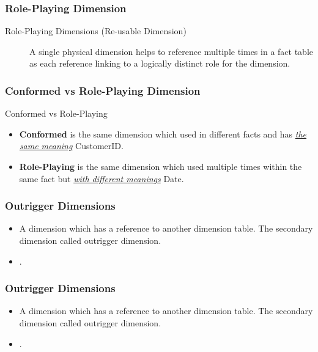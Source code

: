 \begin{frame}
    \frametitle{Role-Playing Dimension}
    \begin{description}
        \item [Role-Playing Dimensions (Re-usable Dimension)] A single physical dimension helps to reference multiple times in a fact table as each reference linking to a logically distinct role for the dimension.
    \end{description}
    \centering
    
\end{frame}
\begin{frame}
    \frametitle{Conformed vs Role-Playing Dimension}
    \begin{block}{Conformed vs Role-Playing}
        \begin{itemize}
            \item \textbf{Conformed} is the same dimension which used in different facts and has \textit{\underline{the same meaning}} \faEdit \space \faArrowCircleORight \space CustomerID.
            \item \textbf{Role-Playing} is the same dimension which used multiple times within the same fact but \textit{\underline{with different meanings}} \faEdit \space \faArrowCircleORight \space Date.
        \end{itemize}
    \end{block}
\end{frame}
\begin{frame}
    \frametitle{Outrigger Dimensions}
    \begin{itemize}[<+->]
        \item A dimension which has a reference to another dimension table. The secondary dimension called outrigger dimension.
        \item {}.
    \end{itemize}
\end{frame}
\begin{frame}
    \frametitle{Outrigger Dimensions}
    \begin{itemize}
        \item A dimension which has a reference to another dimension table. The secondary dimension called outrigger dimension.\\
        \item {}.
    \end{itemize}
    \centering
    
\end{frame}

